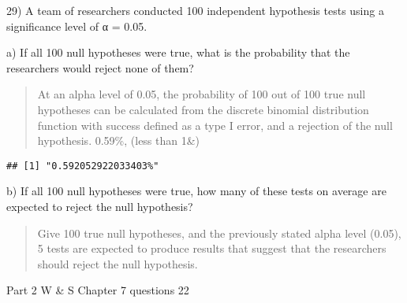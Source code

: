 \documentclass[ignorenonframetext,]{beamer}
\newenvironment{Shaded}{\begin{snugshade}}{\end{snugshade}}
\newcommand{\KeywordTok}[1]{\textcolor[rgb]{0.13,0.29,0.53}{\textbf{#1}}}
\newcommand{\DataTypeTok}[1]{\textcolor[rgb]{0.13,0.29,0.53}{#1}}
\newcommand{\DecValTok}[1]{\textcolor[rgb]{0.00,0.00,0.81}{#1}}
\newcommand{\FloatTok}[1]{\textcolor[rgb]{0.00,0.00,0.81}{#1}}
\newcommand{\StringTok}[1]{\textcolor[rgb]{0.31,0.60,0.02}{#1}}
\newcommand{\OperatorTok}[1]{\textcolor[rgb]{0.81,0.36,0.00}{\textbf{#1}}}
\newcommand{\NormalTok}[1]{#1}
\begin{document}
\begin{frame}[fragile]{29) A team of researchers conducted 100
independent hypothesis tests using a significance level of α = 0.05.}

\begin{block}{a) If all 100 null hypotheses were true, what is the
probability that the researchers would reject none of them?}

\begin{quote}
At an alpha level of 0.05, the probability of 100 out of 100 true null
hypotheses can be calculated from the discrete binomial distribution
function with success defined as a type I error, and a rejection of the
null hypothesis. 0.59\%, (less than 1\&)
\end{quote}

\begin{Shaded}
\end{Shaded}

\begin{verbatim}
## [1] "0.592052922033403%"
\end{verbatim}

\end{block}

\begin{block}{b) If all 100 null hypotheses were true, how many of these
tests on average are expected to reject the null hypothesis?}

\begin{quote}
Give 100 true null hypotheses, and the previously stated alpha level
(0.05), 5 tests are expected to produce results that suggest that the
researchers should reject the null hypothesis.
\end{quote}

\end{block}

\end{frame}

\begin{frame}{Part 2 W \& S Chapter 7 questions 22}

\end{frame}
\end{document}
